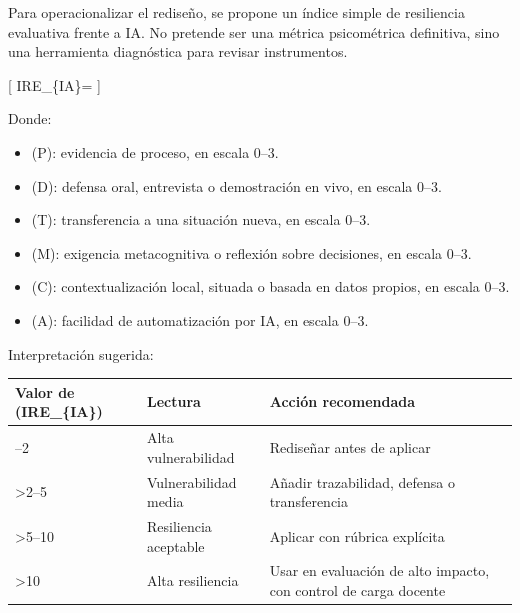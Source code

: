 \documentclass[
  spanish,
  letterpaper,
  DIV=11,
  numbers=noendperiod]{scrartcl}
\providecommand{\tightlist}{%
  \setlength{\itemsep}{0pt}\setlength{\parskip}{0pt}}
\begin{document}
Para operacionalizar el rediseño, se propone un índice simple de
resiliencia evaluativa frente a IA. No pretende ser una métrica
psicométrica definitiva, sino una herramienta diagnóstica para revisar
instrumentos.

{[} IRE\_\{IA\}= {]}

Donde:

\begin{itemize}
\tightlist
\item
  (P): evidencia de proceso, en escala 0--3.
\item
  (D): defensa oral, entrevista o demostración en vivo, en escala 0--3.
\item
  (T): transferencia a una situación nueva, en escala 0--3.
\item
  (M): exigencia metacognitiva o reflexión sobre decisiones, en escala
  0--3.
\item
  (C): contextualización local, situada o basada en datos propios, en
  escala 0--3.
\item
  (A): facilidad de automatización por IA, en escala 0--3.
\end{itemize}

Interpretación sugerida:

\begin{longtable}[]{@{}
  >{\raggedleft\arraybackslash}p{}
  >{\raggedright\arraybackslash}p{}
  >{\raggedright\arraybackslash}p{}@{}}
\toprule\noalign{}
\begin{minipage}[b]{\linewidth}\raggedleft
Valor de (IRE\_\{IA\})
\end{minipage} & \begin{minipage}[b]{\linewidth}\raggedright
Lectura
\end{minipage} & \begin{minipage}[b]{\linewidth}\raggedright
Acción recomendada
\end{minipage} \\
\midrule\noalign{}
\endhead
\bottomrule\noalign{}
\endlastfoot
0--2 & Alta vulnerabilidad & Rediseñar antes de aplicar \\
\textgreater2--5 & Vulnerabilidad media & Añadir trazabilidad, defensa o
transferencia \\
\textgreater5--10 & Resiliencia aceptable & Aplicar con rúbrica
explícita \\
\textgreater10 & Alta resiliencia & Usar en evaluación de alto impacto,
con control de carga docente \\
\end{longtable}
\end{document}

